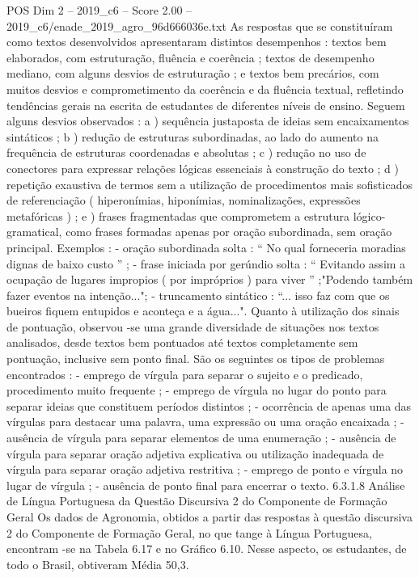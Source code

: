 \begin{textsample}{POS Dim 2 – 2019\_c6 – Score 2.00 – 2019\_c6/enade\_2019\_agro\_96d666036e.txt}
As respostas que se constituíram como textos desenvolvidos apresentaram distintos desempenhos : textos bem elaborados, com estruturação, fluência e coerência ; textos de desempenho mediano, com alguns desvios de estruturação ; e textos bem precários, com muitos desvios e comprometimento da coerência e da fluência textual, refletindo tendências gerais na escrita de estudantes de diferentes níveis de ensino.
Seguem alguns desvios observados : a ) sequência justaposta de ideias sem encaixamentos sintáticos ; b ) redução de estruturas subordinadas, ao lado do aumento na frequência de estruturas coordenadas e absolutas ; c ) redução no uso de conectores para expressar relações lógicas essenciais à construção do texto ; d ) repetição exaustiva de termos sem a utilização de procedimentos mais sofisticados de referenciação ( hiperonímias, hiponímias, nominalizações, expressões metafóricas ) ; e ) frases fragmentadas que comprometem a estrutura lógico-gramatical, como frases formadas apenas por oração subordinada, sem oração principal.
Exemplos : - oração subordinada solta : “ No qual forneceria moradias dignas de baixo custo ” ; - frase iniciada por gerúndio solta : “ Evitando assim a ocupação de lugares impropios ( por impróprios ) para viver ” ;"Podendo também fazer eventos na intenção..."; - truncamento sintático : “... isso faz com que os bueiros fiquem entupidos e aconteça e a água...".
Quanto à utilização dos sinais de pontuação, observou -se uma grande diversidade de situações nos textos analisados, desde textos bem pontuados até textos completamente sem pontuação, inclusive sem ponto final.
São os seguintes os tipos de problemas encontrados : - emprego de vírgula para separar o sujeito e o predicado, procedimento muito frequente ; - emprego de vírgula no lugar do ponto para separar ideias que constituem períodos distintos ; - ocorrência de apenas uma das vírgulas para destacar uma palavra, uma expressão ou uma oração encaixada ; - ausência de vírgula para separar elementos de uma enumeração ; - ausência de vírgula para separar oração adjetiva explicativa ou utilização inadequada de vírgula para separar oração adjetiva restritiva ; - emprego de ponto e vírgula no lugar de vírgula ; - ausência de ponto final para encerrar o texto. 6.3.1.8 Análise de Língua Portuguesa da Questão Discursiva 2 do Componente de Formação Geral Os dados de Agronomia, obtidos a partir das respostas à questão discursiva 2 do Componente de Formação Geral, no que tange à Língua Portuguesa, encontram -se na Tabela 6.17 e no Gráfico 6.10.
Nesse aspecto, os estudantes, de todo o Brasil, obtiveram Média 50,3.

\end{textsample}
